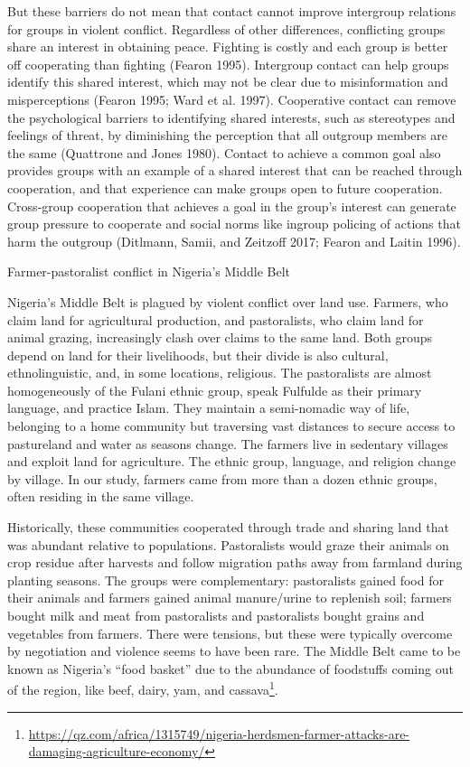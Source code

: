 \documentclass[11pt]{article}
\begin{document}
But these barriers do not mean that contact cannot improve intergroup
relations for groups in violent conflict. Regardless of other
differences, conflicting groups share an interest in obtaining peace.
Fighting is costly and each group is better off cooperating than
fighting (Fearon 1995). Intergroup contact can help groups identify this
shared interest, which may not be clear due to misinformation and
misperceptions (Fearon 1995; Ward et al. 1997). Cooperative contact can
remove the psychological barriers to identifying shared interests, such
as stereotypes and feelings of threat, by diminishing the perception
that all outgroup members are the same (Quattrone and Jones 1980).
Contact to achieve a common goal also provides groups with an example of
a shared interest that can be reached through cooperation, and that
experience can make groups open to future cooperation. Cross-group
cooperation that achieves a goal in the group's interest can generate
group pressure to cooperate and social norms like ingroup policing of
actions that harm the outgroup (Ditlmann, Samii, and Zeitzoff 2017;
Fearon and Laitin 1996).

Farmer-pastoralist conflict in Nigeria's Middle Belt

Nigeria's Middle Belt is plagued by violent conflict over land use.
Farmers, who claim land for agricultural production, and pastoralists,
who claim land for animal grazing, increasingly clash over claims to the
same land. Both groups depend on land for their livelihoods, but their
divide is also cultural, ethnolinguistic, and, in some locations,
religious. The pastoralists are almost homogeneously of the Fulani
ethnic group, speak Fulfulde as their primary language, and practice
Islam. They maintain a semi-nomadic way of life, belonging to a home
community but traversing vast distances to secure access to pastureland
and water as seasons change. The farmers live in sedentary villages and
exploit land for agriculture. The ethnic group, language, and religion
change by village. In our study, farmers came from more than a dozen
ethnic groups, often residing in the same village.

Historically, these communities cooperated through trade and sharing
land that was abundant relative to populations. Pastoralists would graze
their animals on crop residue after harvests and follow migration paths
away from farmland during planting seasons. The groups were
complementary: pastoralists gained food for their animals and farmers
gained animal manure/urine to replenish soil; farmers bought milk and
meat from pastoralists and pastoralists bought grains and vegetables
from farmers. There were tensions, but these were typically overcome by
negotiation and violence seems to have been rare. The Middle Belt came
to be known as Nigeria's ``food basket'' due to the abundance of
foodstuffs coming out of the region, like beef, dairy, yam, and
cassava\footnote{\url{https://qz.com/africa/1315749/nigeria-herdsmen-farmer-attacks-are-damaging-agriculture-economy/}}.
\end{document}
